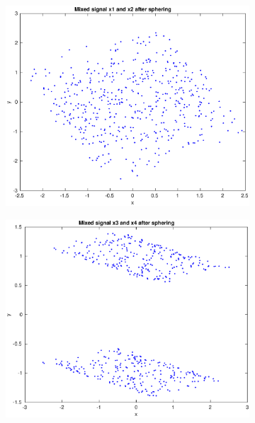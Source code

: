 \documentclass[10pt]{article}
\begin{document}
\begin{figure}
\begin{subfigure}[b]{.49\textwidth}
		\caption{}
		\label{fig1b}
	\end{subfigure}
		\begin{subfigure}[b]{.49\textwidth}
		\includegraphics[width=\columnwidth]{Ass1c.eps}
		\caption{}
		\label{fig1c}
	\end{subfigure}  
	\begin{subfigure}[b]{.49\textwidth}
		\includegraphics[width=\columnwidth]{Ass1d.eps}
		\caption{}
		\label{fig1d}
	\end{subfigure}
  \label{fig1.1}
\end{figure}
\end{document}
